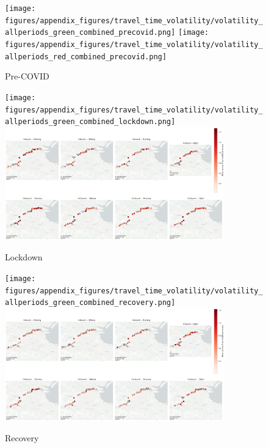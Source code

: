 \begin{figure}[H]
  \centering
  \texttt{[image: figures/appendix\_figures/travel\_time\_volatility/volatility\_allperiods\_green\_combined\_precovid.png]}
  \texttt{[image: figures/appendix\_figures/travel\_time\_volatility/volatility\_allperiods\_red\_combined\_precovid.png]}
  \caption{Pre-COVID}
\end{figure}

\vspace{5cm}
\begin{figure}[H]
  \centering
  \texttt{[image: figures/appendix\_figures/travel\_time\_volatility/volatility\_allperiods\_green\_combined\_lockdown.png]}
  \includegraphics[width=0.85\textwidth]{figures/appendix_figures/travel_time_volatility/volatility_allperiods_red_combined_lockdown.png}
  \caption{Lockdown}
\end{figure}

\vspace{5cm}

\begin{figure}[H]
  \centering
  \texttt{[image: figures/appendix\_figures/travel\_time\_volatility/volatility\_allperiods\_green\_combined\_recovery.png]}
  \includegraphics[width=0.85\textwidth]{figures/appendix_figures/travel_time_volatility/volatility_allperiods_red_combined_recovery.png}
  \caption{Recovery}
\end{figure}

